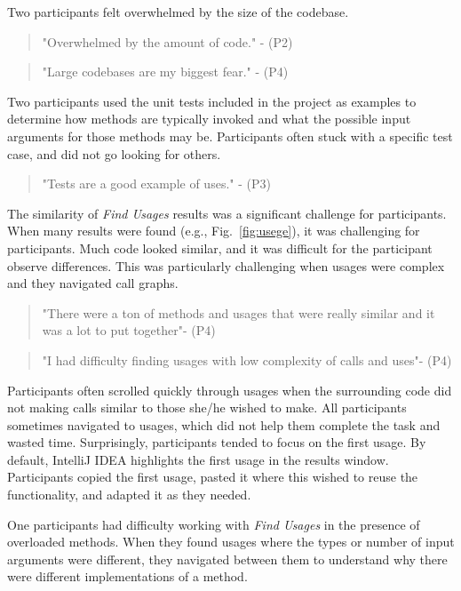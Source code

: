 \documentclass[conference]{IEEEtran}
\begin{document}
\noindent Two participants felt overwhelmed by the size of the codebase.
\begin{quote}"Overwhelmed by the amount of code." - (P2) \end{quote}
\begin{quote}"Large codebases are my biggest fear." - (P4) \end{quote}

Two participants used the unit tests included in the project as examples to determine how methods are typically invoked and what the possible input arguments for those methods may be. Participants often stuck with a specific test case, and did not go looking for others. 
\begin{quote} "Tests are a good example of uses." - (P3)\end{quote}

The similarity of \textit{Find Usages} results was a significant challenge for participants. When many results were found (e.g., Fig.~\ref{fig:usege}), it was challenging for participants. 
Much code looked similar, and it was difficult for the participant observe differences. This was particularly challenging when usages were complex and they navigated call graphs.
\begin{quote}"There were a ton of methods and usages that were really similar and it was a lot to put together"- (P4)\end{quote}
\begin{quote}"I had difficulty finding usages with low complexity of calls and uses"- (P4)\end{quote}

Participants often scrolled quickly through usages when the surrounding code did not making calls similar to those she/he wished to make. All participants sometimes navigated to usages, which did not help them complete the task and wasted time. 
Surprisingly, participants tended to focus on the first usage. By default, IntelliJ IDEA highlights the first usage in the results window. Participants copied the first usage, pasted it where this wished to reuse the functionality, and adapted it as they needed.\par 

One participants had difficulty working with \textit{Find Usages} in the presence of overloaded methods. When they found usages where the types or number of input arguments were different, they navigated between them to understand why there were different implementations of a method.
\end{document}
